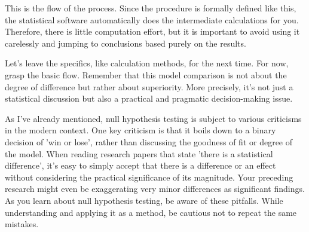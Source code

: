 \documentclass{ltjsbook}
\begin{document}
This is the flow of the process. Since the procedure is formally defined like this, the statistical software automatically does the intermediate calculations for you. Therefore, there is little computation effort, but it is important to avoid using it carelessly and jumping to conclusions based purely on the results.


Let's leave the specifics, like calculation methods, for the next time. For now, grasp the basic flow. Remember that this model comparison is not about the degree of difference but rather about superiority. More precisely, it's not just a statistical discussion but also a practical and pragmatic decision-making issue.

As I've already mentioned, null hypothesis testing is subject to various criticisms in the modern context. One key criticism is that it boils down to a binary decision of 'win or lose', rather than discussing the goodness of fit or degree of the model. When reading research papers that state 'there is a statistical difference', it's easy to simply accept that there is a difference or an effect without considering the practical significance of its magnitude. Your preceding research might even be exaggerating very minor differences as significant findings. As you learn about null hypothesis testing, be aware of these pitfalls. While understanding and applying it as a method, be cautious not to repeat the same mistakes.
\end{document}
